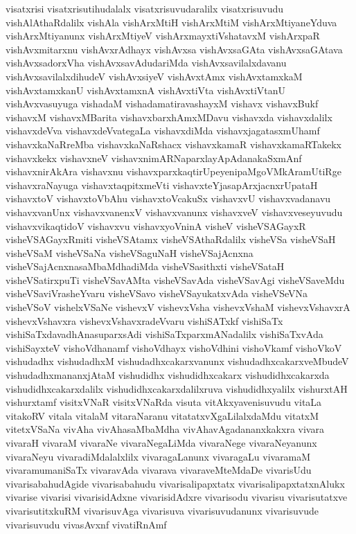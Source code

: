 {visatxrisi
visatxrisutihudalalx
visatxrisuvudaralilx
visatxrisuvudu
vishAlAthaRdalilx
vishAla
vishArxMtiH
vishArxMtiM
vishArxMtiyaneYduva
vishArxMtiyanunx
vishArxMtiyeV
vishArxmayxtiVshatavxM
vishArxpaR
vishAvxmitarxnu
vishAvxrAdhayx
vishAvxsa
vishAvxsaGAta
vishAvxsaGAtava
vishAvxsadorxVha
vishAvxsavAdudariMda
vishAvxsavilalxdavanu
vishAvxsavilalxdihudeV
vishAvxsiyeV
vishAvxtAmx
vishAvxtamxkaM
vishAvxtamxkanU
vishAvxtamxnA
vishAvxtiVta
vishAvxtiVtanU
vishAvxvasuyuga
vishadaM
vishadamatiravashayxM
vishavx
vishavxBukf
vishavxM
vishavxMBarita
vishavxbarxhAmxMDavu
vishavxda
vishavxdalilx
vishavxdeVva
vishavxdeVvategaLa
vishavxdiMda
vishavxjagatasxmUhamf
vishavxkaNaRreMba
vishavxkaNaRshacx
vishavxkamaR
vishavxkamaRTakekx
vishavxkekx
vishavxneV
vishavxnimARNaparxlayApAdanakaSxmAnf
vishavxnirAkAra
vishavxnu
vishavxparxkaqtirUpeyenipaMgoVMkAramUtiRge
vishavxraNayuga
vishavxtaqpitxmeVti
vishavxteYjasapArxjacnxrUpataH
vishavxtoV
vishavxtoVbAhu
vishavxtoVcakuSx
vishavxvU
vishavxvadanavu
vishavxvanUnx
vishavxvanenxV
vishavxvanunx
vishavxveV
vishavxveseyuvudu
vishavxvikaqtidoV
vishavxvu
vishavxyoVninA
visheV
visheVSAGayxR
visheVSAGayxRmiti
visheVSAtamx
visheVSAthaRdalilx
visheVSa
visheVSaH
visheVSaM
visheVSaNa
visheVSaguNaH
visheVSajAcnxna
visheVSajAcnxnasaMbaMdhadiMda
visheVSasithxti
visheVSataH
visheVSatirxpuTi
visheVSavAMta
visheVSavAda
visheVSavAgi
visheVSaveMdu
visheVSaviVrasheYvaru
visheVSavo
visheVSayukatxvAda
visheVSeVNa
visheVSoV
vishelxVSaNe
vishevxV
vishevxVsha
vishevxVshaM
vishevxVshavxrA
vishevxVshavxra
vishevxVshavxradeVvaru
vishiSATxkf
vishiSaTx
vishiSaTxdavadhAnasuparxsAdi
vishiSaTxparxmANadalilx
vishiSaTxvAda
vishiSayxteV
vishoVdhanamf
vishoVdhayx
vishoVdhini
vishoVkamf
vishoVkoV
vishudadhx
vishudadhxM
vishudadhxcakarxvanunx
vishudadhxcakarxveMbudeV
vishudadhxmananxjAtaM
vishudidhx
vishudidhxcakarx
vishudidhxcakarxda
vishudidhxcakarxdalilx
vishudidhxcakarxdalilxruva
vishudidhxyalilx
vishurxtAH
vishurxtamf
visitxVNaR
visitxVNaRda
visuta
vitAkxyavenisuvudu
vitaLa
vitakoRV
vitala
vitalaM
vitaraNaranu
vitatatxvXgaLilalxdaMdu
vitatxM
vitetxVSaNa
vivAha
vivAhasaMbaMdha
vivAhavAgadananxkakxra
vivara
vivaraH
vivaraM
vivaraNe
vivaraNegaLiMda
vivaraNege
vivaraNeyanunx
vivaraNeyu
vivaradiMdalalxlilx
vivaragaLanunx
vivaragaLu
vivaramaM
vivaramumaniSaTx
vivaravAda
vivarava
vivaraveMteMdaDe
vivarisUdu
vivarisabahudAgide
vivarisabahudu
vivarisalipapxtatx
vivarisalipapxtatxnAlukx
vivarise
vivarisi
vivarisidAdxne
vivarisidAdxre
vivarisodu
vivarisu
vivarisutatxve
vivarisutitxkuRM
vivarisuvAga
vivarisuva
vivarisuvudanunx
vivarisuvude
vivarisuvudu
vivasAvxnf
vivatiRnAmf
}
